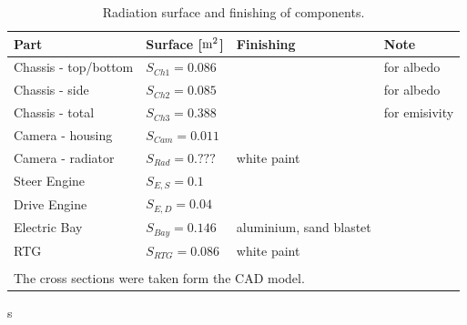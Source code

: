 \begin{table}[H]
	\centering
	\caption{Radiation surface and finishing of components.}
	\begin{tabular}{l@{\qquad}l@{\qquad}ll}
		\hline
		Part  & Surface [${\rm m}^2$] & Finishing & Note \\ \hline
		Chassis - top/bottom & $S_{Ch1}=0.086$ & & for albedo\\
		Chassis - side & $S_{Ch2}=0.085$ & & for albedo\\
		Chassis - total & $S_{Ch3}=0.388$ & & for emisivity\\
		Camera - housing & $S_{Cam}=0.011$ & &\\
		Camera - radiator & $S_{Rad}=0.???$ & white paint &  \\
		Steer Engine& $S_{E,S}=0.1$ & & \\
		Drive Engine& $S_{E,D}=0.04$ & & \\
		Electric Bay& $S_{Bay}=0.146$ & aluminium, sand blastet & \\
		RTG& $S_{RTG}=0.086$ & white paint & \\\hline
		&&& \\
		\multicolumn{3}{l}{The cross sections were taken form the CAD model.}
	\end{tabular}
	\label{tab:tcs_surf}
\end{table}
s
\cleardoublepage

